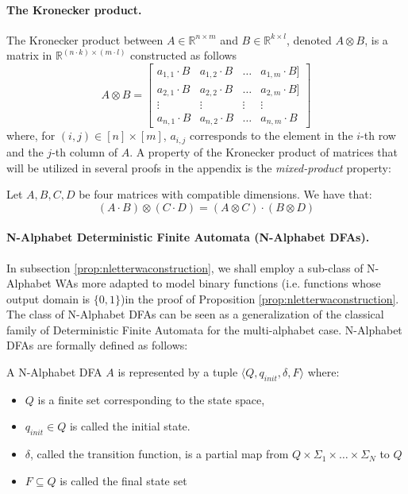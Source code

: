 \paragraph{The Kronecker product.} \label{app:sec:ter} 
The Kronecker product between $A \in \mathbb{R}^{n \times m}$ and $B \in \mathbb{R}^{k \times l}$, denoted $A \otimes B$, is a matrix in $\mathbb{R}^{(n \cdot k) \times (m \cdot l)}$  
constructed as follows 
 $$A \otimes B = \begin{bmatrix}
     a_{1,1} \cdot B & a_{1,2} \cdot B & \dots & a_{1,m} \cdot B] \\ 
     a_{2,1} \cdot B & a_{2,2} \cdot B & \dots &  a_{2,m} \cdot B] \\
     \vdots & \vdots & \vdots & \vdots \\ 
     a_{n,1} \cdot B & a_{n,2} \cdot B & \dots & a_{n,m} \cdot B
 \end{bmatrix}$$
 where, for $(i,j) \in [n] \times [m]$, $a_{i,j}$ corresponds to the element in the $i$-th row and the $j$-th column of $A$. A property of the Kronecker product of matrices that will be utilized in several proofs in the appendix is the \emph{mixed-product} property:

 \begin{property} \label{app:eq:mixedproduct}
  Let $A, B, C, D$ be four matrices with compatible dimensions. We have that:
  $$(A \cdot B) \otimes (C \cdot D) = (A \otimes C) \cdot (B \otimes D)$$
 \end{property}

\paragraph{N-Alphabet Deterministic Finite Automata (N-Alphabet DFAs).} In subsection \ref{prop:nletterwaconstruction}, we shall employ a sub-class of N-Alphabet WAs more adapted to model binary functions (i.e. functions whose output domain is $\{0,1\}$)in the proof of Proposition \ref{prop:nletterwaconstruction}. The class of N-Alphabet DFAs can be seen as a generalization of the classical family of Deterministic Finite Automata for the multi-alphabet case. N-Alphabet DFAs are formally defined as follows:
\begin{definition} \label{app:def:naldfa}
A N-Alphabet DFA $A$ is represented by a tuple $\langle Q, q_{init}, \delta, F \rangle$ where:
\begin{itemize}
    \item $Q$ is a finite set corresponding to the state space,
    \item $q_{init} \in Q$ is called the initial state.
    \item $\delta$, called the transition function, is a partial map from $Q \times \Sigma_{1} \times \ldots \times \Sigma_{N}$ to $Q$
    \item $F \subseteq Q$ is called the final state set
\end{itemize}
\end{definition}

